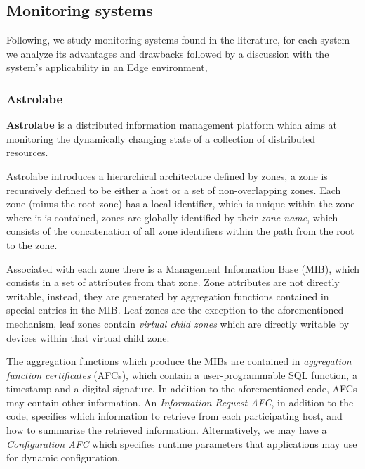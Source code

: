 


\subsection{Monitoring systems}

Following, we study monitoring systems found in the literature, for each system we analyze its advantages and drawbacks followed by a discussion with the system's applicability in an Edge environment,

\subsubsection{Astrolabe}

\textbf{Astrolabe} \cite{Renesse2003} is a distributed information management platform which aims at monitoring the dynamically changing state of a collection of distributed resources. 

Astrolabe introduces a hierarchical architecture defined by zones, a zone is recursively defined to be either a host or a set of non-overlapping zones. Each zone (minus the root zone) has a local identifier, which is unique within the zone where it is contained, zones are globally identified by their \textit{zone name}, which consists of the concatenation of all zone identifiers within the path from the root to the zone.

Associated with each zone there is a Management Information Base (MIB), which consists in a set of attributes from that zone. Zone attributes are not directly writable, instead, they are generated by aggregation functions contained in special entries in the MIB. Leaf zones are the exception to the aforementioned mechanism, leaf zones contain \textit{virtual child zones} which are directly writable by devices within that virtual child zone.

The aggregation functions which produce the MIBs are contained in \textit{aggregation function certificates} (AFCs), which contain a user-programmable SQL function, a timestamp and a digital signature. In addition to the aforementioned code, AFCs may contain other information. An \textit{Information Request AFC}, in addition to the code, specifies which information to retrieve from each participating host, and how to summarize the retrieved information. Alternatively, we may have a \textit{Configuration AFC} which specifies runtime parameters that applications may use for dynamic configuration.

